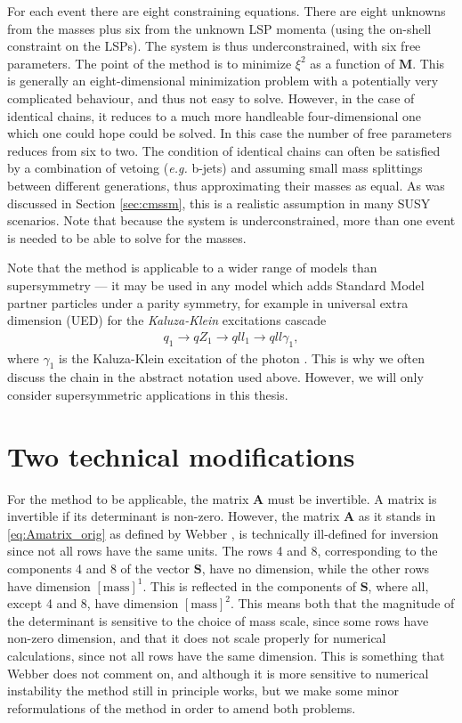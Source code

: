 \documentclass[twoside,english]{uiofysmaster}
\begin{document}
For each event there are eight constraining equations. There are eight unknowns from the masses plus six from the unknown LSP momenta (using the on-shell constraint on the LSPs). The system is thus underconstrained, with six free parameters. The point of the method is to minimize $\xi^2$ as a function of $\mathbf{M}$. This is generally an eight-dimensional minimization problem with a potentially very complicated behaviour, and thus not easy to solve. However, in the case of identical chains, it reduces to a much more handleable four-dimensional one which one could hope could be solved. In this case the number of free parameters reduces from six to two. The condition of identical chains can often be satisfied by a combination of vetoing ({\it e.g.} b-jets) and assuming small mass splittings between different generations, thus approximating their masses as equal. As was discussed in Section \ref{sec:cmssm}, this is a realistic assumption in many SUSY scenarios. Note that because the system is underconstrained, more than one event is needed to be able to solve for the masses.

Note that the method is applicable to a wider range of models than supersymmetry --- it may be used in any model which adds Standard Model partner particles under a parity symmetry, for example in universal extra dimension (UED) for the {\it Kaluza-Klein} excitations cascade
\begin{align}
  q_1 \to qZ_1 \to qll_1 \to qll\gamma_1,
\end{align}
where $\gamma_1$ is the Kaluza-Klein excitation of the photon \cite{Webber:2009vm,Appelquist:2000nn}. This is why we often discuss the chain in the abstract notation used above. However, we will only consider supersymmetric applications in this thesis.

\section{Two technical modifications}\label{sec:dimension_fixing}
For the method to be applicable, the matrix $\mathbf{A}$ must be invertible. A matrix is invertible if its determinant is non-zero. However, the matrix $\mathbf A$ as it stands in \eqref{eq:Amatrix_orig} as defined by Webber \cite{Webber:2009vm}, is technically ill-defined for inversion since not all rows have the same units. The rows 4 and 8, corresponding to the components 4 and 8 of the vector $\mathbf{S}$, have no dimension, while the other rows have dimension $[\mathrm{mass}]^1$. This is reflected in the components of $\mathbf{S}$, where all, except 4 and 8, have dimension $[\mathrm{mass}]^2$. This means both that the magnitude of the determinant is sensitive to the choice of mass scale, since some rows have non-zero dimension, and that it does not scale properly for numerical calculations, since not all rows have the same dimension. This is something that Webber does not comment on, and although it is more sensitive to numerical instability the method still in principle works, but we make some minor reformulations of the method in order to amend both problems.
\end{document}
